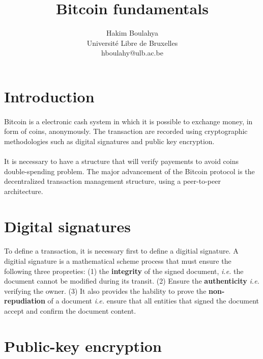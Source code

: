 \documentclass[letterpaper]{article}
\title{Bitcoin fundamentals}
\author{Hakim Boulahya \\
Université Libre de Bruxelles\\
hboulahy@ulb.ac.be}
\begin{document}
\maketitle



\section*{Introduction}
\paragraph{}

Bitcoin is a electronic cash system in which it is possible to exchange
money, in form of coins, anonymously.
The transaction are recorded
using cryptographic methodologies such as digital signatures and
public key encryption.
\paragraph{}

It is necessary to have a structure that will verify payements to
avoid coins double-spending problem.
The major advancement of the Bitcoin protocol
is the decentralized transaction management structure,
using a peer-to-peer architecture.


\section*{Digital signatures}
\paragraph{}

To define a transaction, it is necessary first to define a digitial signature.
A digitial signature is a mathematical scheme process that must ensure
the following three propreties: (1) the \textbf{integrity} of the signed document,
\textit{i.e.} the document cannot be modified during its transit. (2) Ensure
the \textbf{authenticity} \textit{i.e.} verifying the owner.
(3) It also provides the hability to prove the \textbf{non-repudiation}
of a document \textit{i.e.} ensure that all entities that signed the
document accept and confirm the document content.

\section*{Public-key encryption}
\end{document}
